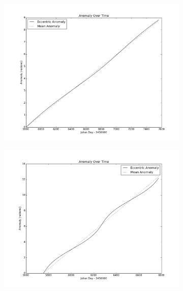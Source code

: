 \documentclass[a4paper,12pt]{article}
\begin{document}
\begin{figure}[!htbp]
\centering
\begin{subfigure}{0.5\textwidth}
  \centering
  \includegraphics[width=\linewidth]{JPLAnomaly.png}
  \caption{}
  \label{fig:sub1}
\end{subfigure}%
\begin{subfigure}{0.5\textwidth}
  \centering
  \includegraphics[width=\linewidth]{UraniaAnomaly.png}
  \caption{}
  \label{fig:sub2}
\end{subfigure}
\caption{}
\label{fig:failedFS}
\end{figure}
\end{document}
